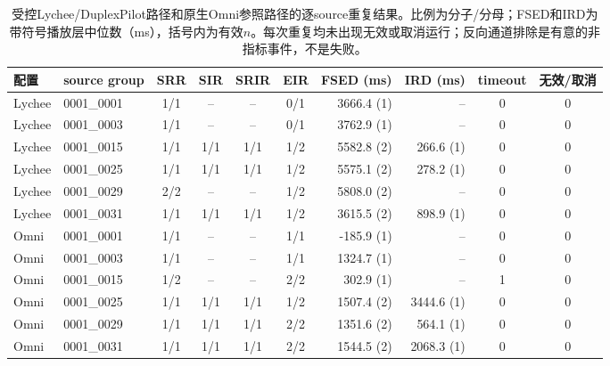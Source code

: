 \begin{table}[t]
\centering
\scriptsize
\setlength{\tabcolsep}{3pt}
\caption{受控Lychee/DuplexPilot路径和原生Omni参照路径的逐source重复结果。比例为分子/分母；FSED和IRD为带符号播放层中位数（ms），括号内为有效$n$。每次重复均未出现无效或取消运行；反向通道排除是有意的非指标事件，不是失败。}
\label{tab:interaction_repeats}
\begin{tabular}{llccccrrcc}
\toprule
配置 & source group & SRR & SIR & SRIR & EIR & FSED (ms) & IRD (ms) & timeout & 无效/取消 \\
\midrule
Lychee & 0001\_0001 & 1/1 & -- & -- & 0/1 & 3666.4 (1) & -- & 0 & 0 \\
Lychee & 0001\_0003 & 1/1 & -- & -- & 0/1 & 3762.9 (1) & -- & 0 & 0 \\
Lychee & 0001\_0015 & 1/1 & 1/1 & 1/1 & 1/2 & 5582.8 (2) & 266.6 (1) & 0 & 0 \\
Lychee & 0001\_0025 & 1/1 & 1/1 & 1/1 & 1/2 & 5575.1 (2) & 278.2 (1) & 0 & 0 \\
Lychee & 0001\_0029 & 2/2 & -- & -- & 1/2 & 5808.0 (2) & -- & 0 & 0 \\
Lychee & 0001\_0031 & 1/1 & 1/1 & 1/1 & 1/2 & 3615.5 (2) & 898.9 (1) & 0 & 0 \\
\midrule
Omni & 0001\_0001 & 1/1 & -- & -- & 1/1 & -185.9 (1) & -- & 0 & 0 \\
Omni & 0001\_0003 & 1/1 & -- & -- & 1/1 & 1324.7 (1) & -- & 0 & 0 \\
Omni & 0001\_0015 & 1/2 & -- & -- & 2/2 & 302.9 (1) & -- & 1 & 0 \\
Omni & 0001\_0025 & 1/1 & 1/1 & 1/1 & 1/2 & 1507.4 (2) & 3444.6 (1) & 0 & 0 \\
Omni & 0001\_0029 & 1/1 & 1/1 & 1/1 & 2/2 & 1351.6 (2) & 564.1 (1) & 0 & 0 \\
Omni & 0001\_0031 & 1/1 & 1/1 & 1/1 & 2/2 & 1544.5 (2) & 2068.3 (1) & 0 & 0 \\
\bottomrule
\end{tabular}
\end{table}
